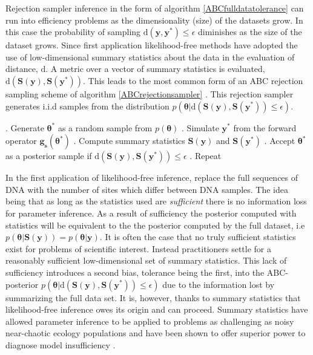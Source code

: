 Rejection sampler inference in the form of algorithm \ref{ABCfulldatatolerance} can run into efficiency problems as the dimensionality (size) of the datasets grow. In this case the probability of sampling $\text{d}(\bm{y},\bm{y^*})\leq\epsilon$ diminishes as the size of the dataset grows. Since first application \citep{Tavare1997} likelihood-free methods have adopted the use of low-dimensional summary statistics about the data in the evaluation of distance, $\text{d}$. A metric over a vector of summary statistics is evaluated, $\text{d}(\bm{S}(\bm{y}),\bm{S}(\bm{y^*}))$. This leads to the most common form of an ABC rejection sampling scheme of algorithm \ref{ABCrejectionsampler} \citep{Pritchard1999a}. This rejection sampler generates i.i.d samples from the distribution $p(\bm{\theta}|\text{d}(\bm{S}(\bm{y}),\bm{S}(\bm{y^*}))\leq\epsilon)$.

\begin{algorithm}[H]
	\caption{ }
	\begin{algorithmic}
		. Generate $\bm{\theta^*}$ as a random sample from $p(\bm{\theta})$		
		. Simulate $\bm{y^*}$ from the forward operator $\bm{g_s}(\bm{\theta^*})$		
		. Compute summary statistics $\bm{S}(\bm{y})$ and $\bm{S}(\bm{y^*})$		
		. Accept $\bm{\theta^*}$ as a posterior sample if $\text{d}(\bm{S}(\bm{y}),\bm{S}(\bm{y^*}))\leq\epsilon$		
		. Repeat
	\end{algorithmic}
	\label{ABCrejectionsampler}
\end{algorithm}

In the first application of likelihood-free inference, \citet{Tavare1997} replace the full sequences of DNA with the number of sites which differ between DNA samples. The idea being that as long as the statistics used are \textit{sufficient} there is no information loss for parameter inference. As a result of sufficiency the posterior computed with statistics will be equivalent to the the posterior computed by the full dataset, i.e $p(\bm{\theta}|\bm{S}(\bm{y})) = p(\bm{\theta}|\bm{y})$. It is often the case that no truly sufficient statistics exist for problems of scientific interest. Instead practitioners settle for a reasonably sufficient low-dimensional set of summary statistics. This lack of sufficiency introduces a second bias, tolerance being the first, into the ABC-posterior $p(\bm{\theta}|\text{d}(\bm{S}(\bm{y}),\bm{S}(\bm{y^*}))\leq\epsilon)$ due to the information lost by summarizing the full data set. It is, however, thanks to summary statistics that likelihood-free inference owes its origin and can proceed. Summary statistics have allowed parameter inference to be applied to problems as challenging as noisy near-chaotic ecology populations \citep{Wood2010} and have been shown to offer superior power to diagnose model insufficiency \citep{Ratmann2009,vrugt2013toward}.\par

